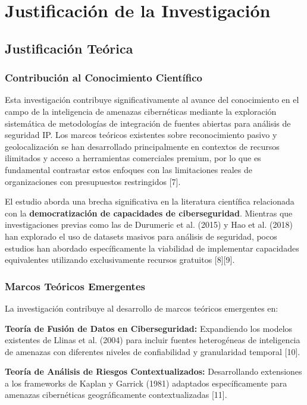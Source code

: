 \section{Justificación de la Investigación}

\subsection{Justificación Teórica}

\subsubsection{Contribución al Conocimiento Científico}
Esta investigación contribuye significativamente al avance del conocimiento en el campo de la inteligencia de amenazas cibernéticas mediante la exploración sistemática de metodologías de integración de fuentes abiertas para análisis de seguridad IP. Los marcos teóricos existentes sobre reconocimiento pasivo y geolocalización se han desarrollado principalmente en contextos de recursos ilimitados y acceso a herramientas comerciales premium, por lo que es fundamental contrastar estos enfoques con las limitaciones reales de organizaciones con presupuestos restringidos [7].

El estudio aborda una brecha significativa en la literatura científica relacionada con la \textbf{democratización de capacidades de ciberseguridad}. Mientras que investigaciones previas como las de Durumeric et al. (2015) y Hao et al. (2018) han explorado el uso de datasets masivos para análisis de seguridad, pocos estudios han abordado específicamente la viabilidad de implementar capacidades equivalentes utilizando exclusivamente recursos gratuitos [8][9].

\subsubsection{Marcos Teóricos Emergentes}
La investigación contribuye al desarrollo de marcos teóricos emergentes en:

\textbf{Teoría de Fusión de Datos en Ciberseguridad:} Expandiendo los modelos existentes de Llinas et al. (2004) para incluir fuentes heterogéneas de inteligencia de amenazas con diferentes niveles de confiabilidad y granularidad temporal [10].

\textbf{Teoría de Análisis de Riesgos Contextualizados:} Desarrollando extensiones a los frameworks de Kaplan y Garrick (1981) adaptados específicamente para amenazas cibernéticas geográficamente contextualizadas [11].

